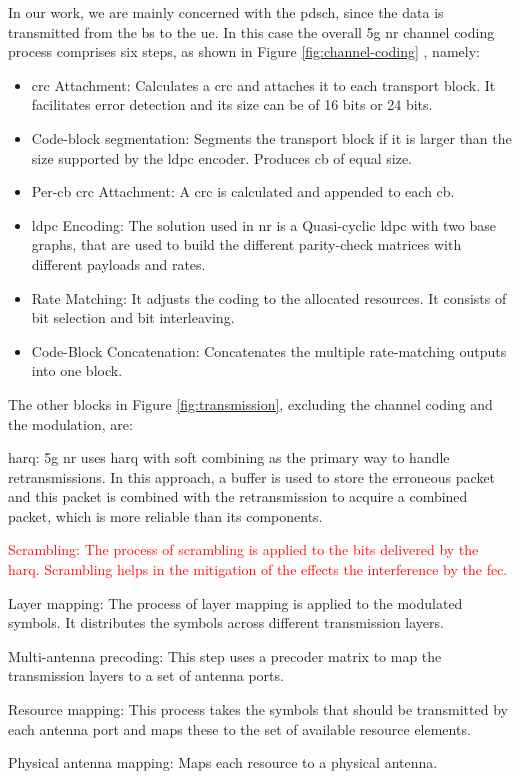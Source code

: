 In our work, we are mainly concerned with the \gls{pdsch}, since the data is transmitted from the \gls{bs} to the \gls{ue}.
%
In this case the overall \gls{5g} \gls{nr} channel coding process comprises six steps, as shown in Figure \ref{fig:channel-coding} \cite{ErikDahlman5G}, namely:
\begin{itemize}
	\item \Gls{crc} Attachment: Calculates a \gls{crc} and attaches it to each transport block. It facilitates error detection and its size can be of 16 bits or 24 bits.
	\item Code-block segmentation: Segments the transport block if it is larger than the size supported by the \gls{ldpc} encoder. Produces \gls{cb} of equal size.
	\item Per-\gls{cb} \gls{crc} Attachment: A \gls{crc} is calculated and appended to each \gls{cb}.
	\item \gls{ldpc} Encoding: The solution used in \gls{nr} is a Quasi-cyclic \gls{ldpc} with two base graphs, that are used to build the different parity-check matrices with different payloads and rates.
	\item Rate Matching: It adjusts the coding to the allocated resources. It consists of bit selection and bit interleaving.
	\item Code-Block Concatenation: Concatenates the multiple rate-matching outputs into one block.
\end{itemize}

The other blocks in Figure \ref{fig:transmission}, excluding the channel coding and the modulation, are:
\begin{enumerate}
	\item \Gls{harq}: \gls{5g} \gls{nr} uses \gls{harq} with soft combining as the primary way to handle retransmissions. In this approach, a buffer is used to store the erroneous packet and this packet is combined with the retransmission to acquire a combined packet, which is more reliable than its components.
    \textcolor{red}{
	\item Scrambling: The process of scrambling is applied to the bits delivered by the \gls{harq}. Scrambling helps in the mitigation of the effects the interference by the \gls{fec}.}
	\item Layer mapping: The process of layer mapping is applied to the modulated symbols. It distributes the symbols across different transmission layers.
	\item Multi-antenna precoding: This step uses a precoder matrix to map the transmission layers to a set of antenna ports.
	\item Resource mapping: This process takes the symbols that should be transmitted by each antenna port and maps these to the set of available resource elements.
	\item Physical antenna mapping: Maps each resource to a physical antenna.
\end{enumerate}

